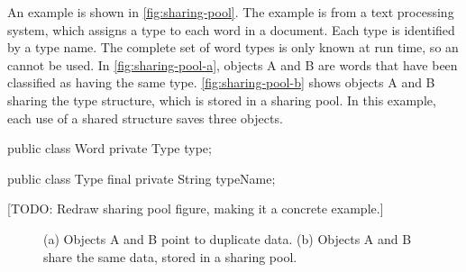 An example is shown in \autoref{fig:sharing-pool}. The example is from a
text processing system, which assigns a type to each word in a document.
Each type is identified by a  type name.
The complete set of word types is only known at run time, so an 
cannot be used.  In \autoref{fig:sharing-pool-a}, objects A and B
are words that have been classified as having the same type. 
\autoref{fig:sharing-pool-b} shows objects A and B sharing the type
structure, which is stored in a sharing pool. In this example, each use of a
shared structure saves three objects.

\begin{shortlisting}
public class Word {
	private Type type;
}

public class Type {
	final private String typeName;
}
\end{shortlisting}

[TODO: Redraw sharing pool figure, making it a concrete example.]

\begin{figure}
\centering
	\hspace{0.18\textwidth}
    \caption{(a) Objects A and B point to duplicate data. (b) Objects A and B
    share the same data, stored in a sharing pool.}
	\label{fig:sharing-pool}
\end{figure}


